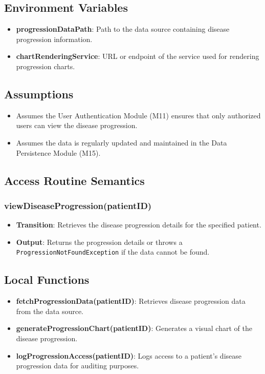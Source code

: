 \documentclass[12pt, titlepage]{article}
\begin{document}
\subsection{Environment Variables}
\begin{itemize}
\item \textbf{progressionDataPath}: Path to the data source containing disease progression information.
\item \textbf{chartRenderingService}: URL or endpoint of the service used for rendering progression charts.
\end{itemize}

\subsection{Assumptions}
\begin{itemize}
    \item Assumes the User Authentication Module (M11) ensures that only authorized users can view the disease progression.
    \item Assumes the data is regularly updated and maintained in the Data Persistence Module (M15).
\end{itemize}

\subsection{Access Routine Semantics}
\subsubsection{viewDiseaseProgression(patientID)}
\begin{itemize}
    \item \textbf{Transition}: Retrieves the disease progression details for the specified patient.
    \item \textbf{Output}: Returns the progression details or throws a \texttt{ProgressionNotFoundException} if the data cannot be found.
\end{itemize}

\subsection{Local Functions}
\begin{itemize}
\item \textbf{fetchProgressionData(patientID)}: Retrieves disease progression data from the data source.
\item \textbf{generateProgressionChart(patientID)}: Generates a visual chart of the disease progression.
\item \textbf{logProgressionAccess(patientID)}: Logs access to a patient's disease progression data for auditing purposes.
\end{itemize}
\end{document}
